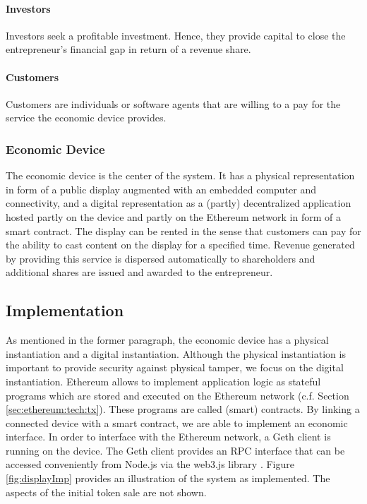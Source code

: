 \paragraph{Investors}

Investors seek a profitable investment. Hence, they provide capital to close the entrepreneur's financial gap in return of a revenue share.

\paragraph{Customers}

Customers are individuals or software agents that are willing to a pay for the service the economic device provides.

\subsubsection{Economic Device}

The economic device is the center of the system. It has a physical representation in form of a public display augmented with an embedded computer and connectivity, and a digital representation as a (partly) decentralized application hosted partly on the device and partly on the Ethereum network in form of a smart contract. The display can be rented in the sense that customers can pay for the ability to cast content on the display for a specified time. Revenue generated by providing this service is dispersed automatically to shareholders and additional shares are issued and awarded to the entrepreneur.

\subsection{Implementation}

As mentioned in the former paragraph, the economic device has a physical instantiation and a digital instantiation. Although the physical instantiation is important to provide security against physical tamper, we focus on the digital instantiation. Ethereum allows to implement application logic as stateful programs which are stored and executed on the Ethereum network (c.f. Section \ref{sec:ethereum:tech:tx}). These programs are called (smart) contracts. By linking a connected device with a smart contract, we are able to implement an economic interface. In order to interface with the Ethereum network, a Geth client \parencite{Geth} is running on the device. The Geth client provides an \ac{RPC} interface that can be accessed conveniently from Node.js via the web3.js library \parencite{Web3}. Figure \ref{fig:displayImp} provides an illustration of the system as implemented. The aspects of the initial token sale are not shown. 

